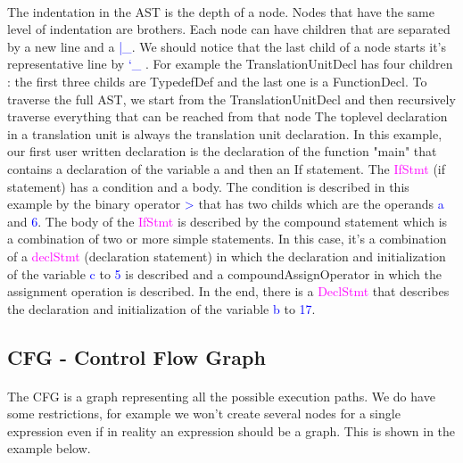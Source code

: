 \documentclass{report}
\begin{document}
\paragraph{}
\hspace{4mm}
The indentation in the AST is the depth of a node. Nodes that have
the same level of indentation are brothers. Each node can have 
children that are separated by a new line and a \textcolor{blue}{|\_}. 
We should notice
that the last child of a node starts it's representative line by \textcolor{blue}{`\_}
.  For example the \textcolor{oliveGreen}{TranslationUnitDecl} has four children :
the first three childs are \textcolor{oliveGreen}{TypedefDef} and
 the last one is a \textcolor{oliveGreen}{FunctionDecl}.
To traverse the full AST, we start from the \textcolor{oliveGreen}{TranslationUnitDecl}
 and then recursively traverse everything 
that can be reached from that node
The toplevel declaration in a translation unit is always the
 translation unit declaration. 
In this example, our first user written declaration 
is the declaration of the function "main" that contains
a declaration of the variable a and then an If statement.
The \textcolor{magenta}{IfStmt} (if statement) has a condition and a body. The condition is 
described in this example by the binary operator \textcolor{blue}{>} that has two
childs which are the operands \textcolor{blue}{a} and \textcolor{blue}{6}. 
The body of the \textcolor{magenta}{IfStmt} is described by the compound statement which is 
a combination of two or more simple statements. In this case, it's 
a combination of a \textcolor{magenta}{declStmt} (declaration statement) in which the declaration and 
initialization of  the variable \textcolor{blue}{c} to \textcolor{blue}{5} 
is described and a compoundAssignOperator 
in which the assignment operation is described.
In the end, there is a \textcolor{magenta}{DeclStmt} that describes the declaration and initialization
of the variable \textcolor{blue}{b} to \textcolor{blue}{17}.

\subsection{CFG - Control Flow Graph}

\paragraph{}
\hspace{4mm}The CFG is a graph representing all the possible execution paths. We do have some restrictions, for example
we won't create several nodes for a single expression even if in reality an expression should be a graph.
This is shown in the example below.
\end{document}
